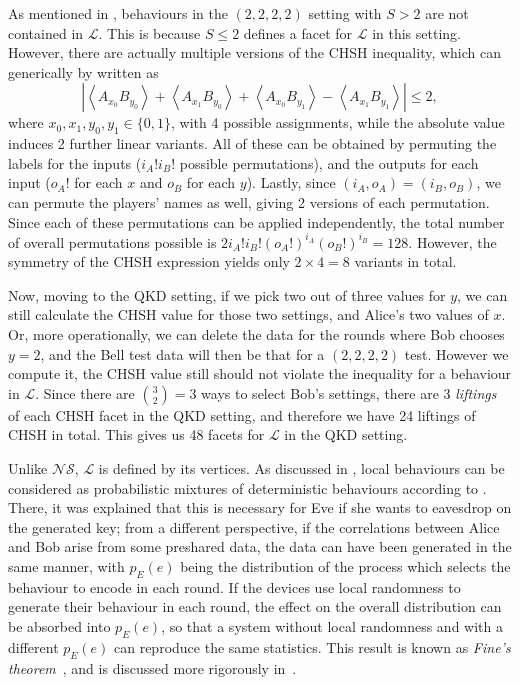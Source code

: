 \documentclass[10pt, a4paper]{article}
\numberwithin{equation}{section} %
\theoremstyle{definition}
\theoremstyle{plain}
\newcommand{\abs}[1]{\left\lvert#1\right\rvert}
\newcommand{\?}{\mathrel{?}} %
\newcommand{\angleb}[1]{\left\langle #1 \right\rangle} %
\newcommand{\Ls}{\mathcal{L}}
\newcommand{\NSs}{\mathcal{NS}}
\begin{document}
      As mentioned in , behaviours in the \((2,2,2,2)\) setting with \(S > 2\) are not contained in \(\Ls\). This is because \(S \leq 2\) defines a facet for \(\Ls\) in this setting. However, there are actually multiple versions of the CHSH inequality, which can generically by written as
      \[ \abs{\angleb{A_{x_0} B_{y_0}} + \angleb{A_{x_1} B_{y_0}} + \angleb{A_{x_0} B_{y_1}} - \angleb{A_{x_1} B_{y_1}}} \leq 2, \]
      where \(x_0, x_1, y_0, y_1 \in \{0,1\}\), with 4 possible assignments, while the absolute value induces 2 further linear variants. All of these can be obtained by permuting the labels for the inputs (\(i_A!i_B!\) possible permutations), and the outputs for each input (\(o_A!\) for each \(x\) and \(o_B\) for each \(y\)). Lastly, since \((i_A, o_A) = (i_B, o_B)\), we can permute the players' names as well, giving 2 versions of each permutation. Since each of these permutations can be applied independently, the total number of overall permutations possible is \(2i_A!i_B!(o_A!)^{i_A}(o_B!)^{i_B} = 128\). However, the symmetry of the CHSH expression yields only \(2 \times 4 = 8\) variants in total.

      Now, moving to the QKD setting, if we pick two out of three values for \(y\), we can still calculate the CHSH value for those two settings, and Alice's two values of \(x\). Or, more operationally, we can delete the data for the rounds where Bob chooses \(y=2\), and the Bell test data will then be that for a \((2,2,2,2)\) test. However we compute it, the CHSH value still should not violate the inequality for a behaviour in \(\Ls\). Since there are \(\binom{3}{2} = 3\) ways to select Bob's settings, there are 3 \emph{liftings} of each CHSH facet in the QKD setting, and therefore we have 24 liftings of CHSH in total. This gives us 48 facets for \(\Ls\) in the QKD setting.

      Unlike \(\NSs\), \(\Ls\) is defined by its vertices. As discussed in , local behaviours can be considered as probabilistic mixtures of deterministic behaviours according to . There, it was explained that this is necessary for Eve if she wants to eavesdrop on the generated key; from a different perspective, if the correlations between Alice and Bob arise from some preshared data, the data can have been generated in the same manner, with \(p_E(e)\) being the distribution of the process which selects the behaviour to encode in each round. If the devices use local randomness to generate their behaviour in each round, the effect on the overall distribution can be absorbed into \(p_E(e)\), so that a system without local randomness and with a different \(p_E(e)\) can reproduce the same statistics. This result is known as \emph{Fine's theorem}~\cite{FineThm}, and is discussed more rigorously in~\cite{BellNonlocality}.
\end{document}
